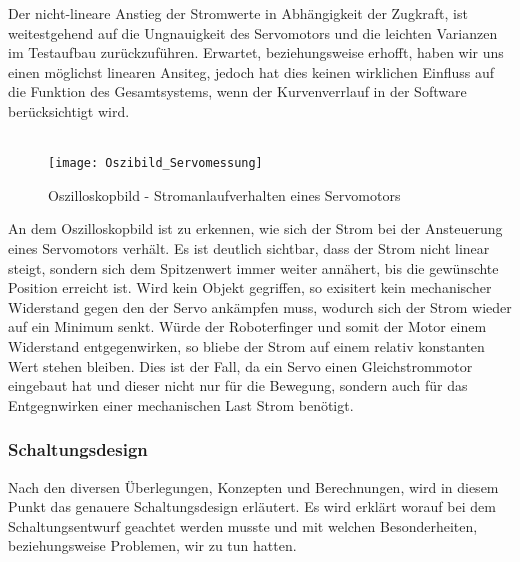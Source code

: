 \documentclass[titlepage,12pt,twoside]{article}
\begin{document}
\hfill \break
Der nicht-lineare Anstieg der Stromwerte in Abhängigkeit der Zugkraft, ist weitestgehend auf die Ungnauigkeit des Servomotors
und die leichten Varianzen im Testaufbau zurückzuführen. Erwartet, beziehungsweise erhofft, haben wir uns einen möglichst linearen
Ansiteg, jedoch hat dies keinen wirklichen Einfluss auf die Funktion des Gesamtsystems, wenn der Kurvenverrlauf in der Software
berücksichtigt wird. \\
\\
\begin{figure}[H]
	\begin{center}
		\scalebox{0.8}
		{\texttt{[image: Oszibild\_Servomessung]}}
		\caption{Oszilloskopbild - Stromanlaufverhalten eines Servomotors}
		\label{fig:Oszibild_Servomessung}	
	\end{center}
\end{figure}
\hfill \break
An dem Oszilloskopbild ist zu erkennen, wie sich der Strom bei der Ansteuerung eines Servomotors verhält. Es ist deutlich sichtbar,
dass der Strom nicht linear steigt, sondern sich dem Spitzenwert immer weiter annähert, bis die gewünschte Position erreicht ist.
Wird kein Objekt gegriffen, so exisitert kein mechanischer Widerstand gegen den der Servo ankämpfen muss, wodurch sich der Strom
wieder auf ein Minimum senkt. Würde der Roboterfinger und somit der Motor einem Widerstand entgegenwirken, so bliebe der Strom auf
einem relativ konstanten Wert stehen bleiben. Dies ist der Fall, da ein Servo einen Gleichstrommotor eingebaut hat und dieser nicht 
nur für die Bewegung, sondern auch für das Entgegnwirken einer mechanischen Last Strom benötigt. 

\subsubsection{Schaltungsdesign}
\label{chap:Schaltungsdesign_Roboterhand}
Nach den diversen Überlegungen, Konzepten und Berechnungen, wird in diesem Punkt das genauere Schaltungsdesign erläutert. Es wird
erklärt worauf bei dem Schaltungsentwurf geachtet werden musste und mit welchen Besonderheiten, beziehungsweise Problemen, wir zu
tun hatten. 
\end{document}
